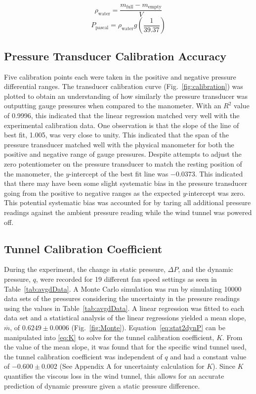\documentclass[journal,letterpaper]{IEEEtran}
\begin{document}
\begin{equation} \label{eq:density}
    \rho_\text{water} = \frac{m_\text{full} - m_\text{empty}}{V}
\end{equation}
\begin{equation} \label{eq:convFactor}
    P_\text{pascal} = \rho_\text{water}g\left(\frac{1}{39.37}\right)
\end{equation}

\subsection{Pressure Transducer Calibration Accuracy}

Five calibration points each were taken in the positive and negative pressure differential ranges.
The transducer calibration curve (Fig.~\ref{fig:calibration}) was plotted to obtain an understanding of how similarly the pressure transducer was outputting gauge pressures when compared to the manometer.
With an $R^2$ value of 0.9996, this indicated that the linear regression matched very well with the experimental calibration data.
One observation is that the slope of the line of best fit, 1.005, was very close to unity.
This indicated that the span of the pressure transducer matched well with the physical manometer for both the positive and negative range of gauge pressures.
Despite attempts to adjust the zero potentiometer on the pressure transducer to match the resting position of the manometer, the $y$-intercept of the best fit line was $-0.0373$.
This indicated that there may have been some slight systematic bias in the pressure transducer going from the positive to negative ranges as the expected $y$-intercept was zero.
This potential systematic bias was accounted for by taring all additional pressure readings against the ambient pressure reading while the wind tunnel was powered off.

\subsection{Tunnel Calibration Coefficient}

During the experiment, the change in static pressure, $\Delta P$, and the dynamic pressure, $q$, were recorded for 19 different fan speed settings as seen in Table~\ref{tab:avgdData}.
A Monte Carlo simulation was run by simulating 10000 data sets of the pressures considering the uncertainty in the pressure readings using the values in Table~\ref{tab:avgdData}.
A linear regression was fitted to each data set and a statistical analysis of the linear regressions yielded a mean slope, $\overline{m}$, of $0.6249 \pm 0.0006$ (Fig.~\ref{fig:Monte}).
Equation~\eqref{eq:stat2dynP} can be manipulated into \eqref{eq:K} to solve for the tunnel calibration coefficient, $K$.
From the value of the mean slope, it was found that for the specific wind tunnel used, the tunnel calibration coefficient was independent of $q$ and had a constant value of $-0.600 \pm 0.002$ (See Appendix A for uncertainty calculation for $K$). Since $K$ quantifies the viscous loss in the wind tunnel, this allows for an accurate prediction of dynamic pressure given a static pressure difference.
\end{document}

